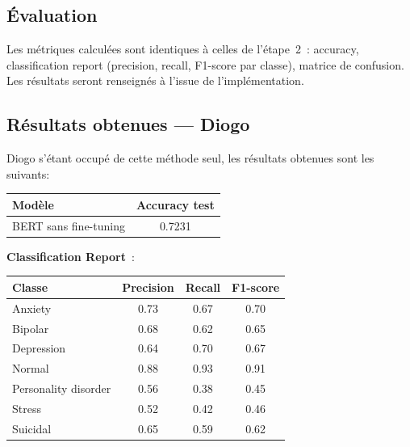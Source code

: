 \documentclass[12pt,a4paper]{report}
\begin{document}
\subsection{Évaluation}

Les métriques calculées sont identiques à celles de l'étape~2~: accuracy, classification
report (precision, recall, F1-score par classe), matrice de confusion. Les résultats seront
renseignés à l'issue de l'implémentation.

\pagebreak

\subsection{Résultats obtenues — Diogo}

Diogo s'étant occupé de cette méthode seul, les résultats obtenues sont les suivants:\\

\begin{center}
\begin{tabular}{@{}lc@{}}
  \toprule
  \textbf{Modèle} & \textbf{Accuracy test}\\
  \midrule
  BERT sans fine-tuning & 0.7231 \\
  \bottomrule
\end{tabular}
\end{center}

\vspace{0.5cm}

\begin{center}
\textbf{Classification Report}~:\\
\bigskip
\begin{tabular}{@{}lccc@{}}
  \toprule
  Classe & Precision & Recall & F1-score \\
  \midrule
             Anxiety   &    0.73   &   0.67   &   0.70\\
             Bipolar   &    0.68   &   0.62   &   0.65\\
          Depression   &    0.64   &   0.70   &   0.67\\
              Normal   &    0.88   &   0.93   &   0.91\\
Personality disorder   &    0.56   &   0.38   &   0.45\\
              Stress   &    0.52   &   0.42   &   0.46\\
            Suicidal   &    0.65   &   0.59   &   0.62\\
  \bottomrule
\end{tabular}
\end{center}
\end{document}
